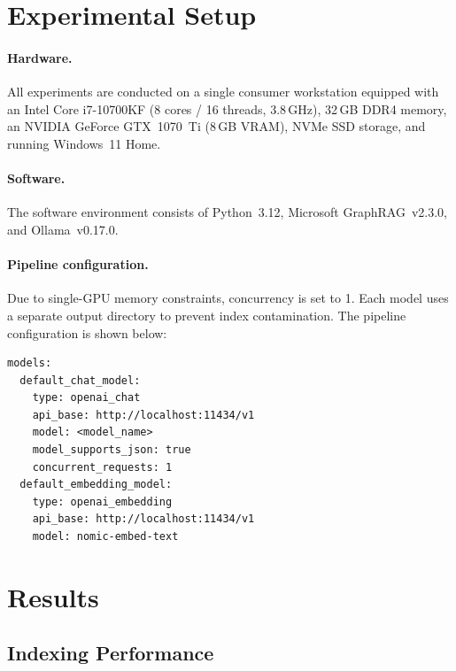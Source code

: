 \documentclass{article}
\begin{document}
\section{Experimental Setup}
\label{sec:experimentalsetup}

\paragraph{Hardware.}
All experiments are conducted on a single consumer workstation equipped with an Intel Core i7-10700KF (8 cores / 16 threads, 3.8\,GHz), 32\,GB DDR4 memory, an NVIDIA GeForce GTX~1070~Ti (8\,GB VRAM), NVMe SSD storage, and running Windows~11 Home.

\paragraph{Software.}
The software environment consists of Python~3.12, Microsoft GraphRAG~v2.3.0, and Ollama~v0.17.0.

\paragraph{Pipeline configuration.}
Due to single-GPU memory constraints, concurrency is set to 1. Each model uses a separate output directory to prevent index contamination. The pipeline configuration is shown below:

{\small
\begin{verbatim}
models:
  default_chat_model:
    type: openai_chat
    api_base: http://localhost:11434/v1
    model: <model_name>
    model_supports_json: true
    concurrent_requests: 1
  default_embedding_model:
    type: openai_embedding
    api_base: http://localhost:11434/v1
    model: nomic-embed-text
\end{verbatim}
}

\section{Results}
\label{sec:results}

\subsection{Indexing Performance}
\end{document}
